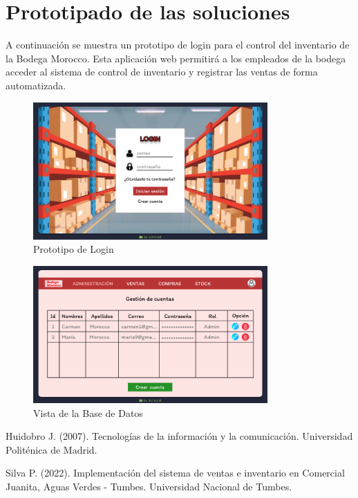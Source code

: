 \documentclass{article}
\begin{document}
\newpage

\section{Prototipado de las soluciones}

A continuación se muestra un prototipo de login para el control del inventario de la Bodega Morocco. Esta aplicación web permitirá a los empleados de la bodega acceder al sistema de control de inventario y registrar las ventas de forma automatizada.


\begin{figure}[H]
  \centering
  \includegraphics[width=0.8\textwidth]{./assets/login.png}
  \caption{Prototipo de Login}
\end{figure}

\begin{figure}[H]
  \centering
  \includegraphics[width=0.8\textwidth]{./assets/bd.png}
  \caption{Vista de la Base de Datos}
\end{figure}

\newpage

\begin{thebibliography}{9}

  Huidobro J. (2007). Tecnologías de la información y la comunicación. Universidad Politénica de Madrid.

  Silva P. (2022). Implementación del sistema de ventas e inventario en Comercial Juanita, Aguas Verdes - Tumbes. Universidad Nacional de Tumbes.

\end{thebibliography}
\end{document}

